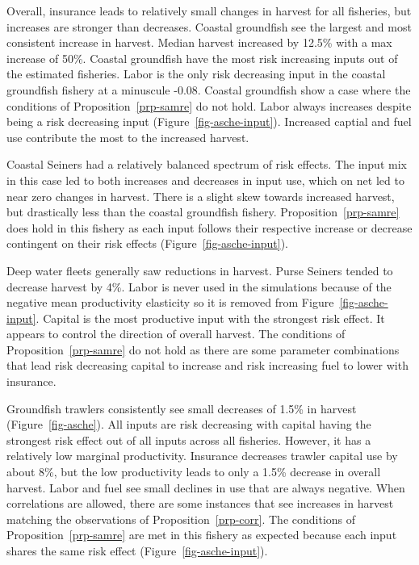 \documentclass[
  letterpaper,
  DIV=11,
  numbers=noendperiod]{scrartcl}
\theoremstyle{plain}
\theoremstyle{plain}
\theoremstyle{remark}
\begin{document}
Overall, insurance leads to relatively small changes in harvest for all
fisheries, but increases are stronger than decreases. Coastal groundfish
see the largest and most consistent increase in harvest. Median harvest
increased by 12.5\% with a max increase of 50\%. Coastal groundfish have
the most risk increasing inputs out of the estimated fisheries. Labor is
the only risk decreasing input in the coastal groundfish fishery at a
minuscule -0.08. Coastal groundfish show a case where the conditions of
Proposition~\ref{prp-samre} do not hold. Labor always increases despite
being a risk decreasing input (Figure~\ref{fig-asche-input}). Increased
captial and fuel use contribute the most to the increased harvest.

Coastal Seiners had a relatively balanced spectrum of risk effects. The
input mix in this case led to both increases and decreases in input use,
which on net led to near zero changes in harvest. There is a slight skew
towards increased harvest, but drastically less than the coastal
groundfish fishery. Proposition~\ref{prp-samre} does hold in this
fishery as each input follows their respective increase or decrease
contingent on their risk effects (Figure~\ref{fig-asche-input}).

Deep water fleets generally saw reductions in harvest. Purse Seiners
tended to decrease harvest by 4\%. Labor is never used in the
simulations because of the negative mean productivity elasticity so it
is removed from Figure~\ref{fig-asche-input}. Capital is the most
productive input with the strongest risk effect. It appears to control
the direction of overall harvest. The conditions of
Proposition~\ref{prp-samre} do not hold as there are some parameter
combinations that lead risk decreasing capital to increase and risk
increasing fuel to lower with insurance.

Groundfish trawlers consistently see small decreases of 1.5\% in harvest
(Figure~\ref{fig-asche}). All inputs are risk decreasing with capital
having the strongest risk effect out of all inputs across all fisheries.
However, it has a relatively low marginal productivity. Insurance
decreases trawler capital use by about 8\%, but the low productivity
leads to only a 1.5\% decrease in overall harvest. Labor and fuel see
small declines in use that are always negative. When correlations are
allowed, there are some instances that see increases in harvest matching
the observations of Proposition~\ref{prp-corr}. The conditions of
Proposition~\ref{prp-samre} are met in this fishery as expected because
each input shares the same risk effect (Figure~\ref{fig-asche-input}).
\end{document}
